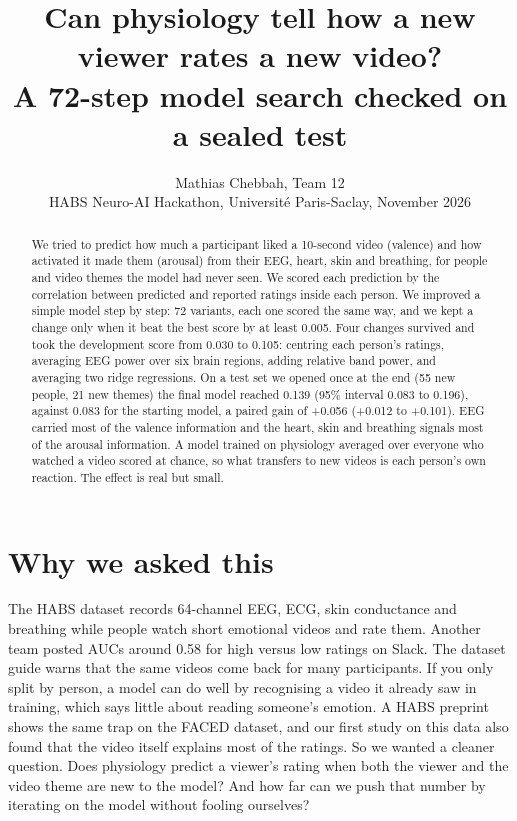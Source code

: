 \documentclass[10pt]{article}
\title{Can physiology tell how a new viewer rates a new video?\\
A 72-step model search checked on a sealed test}
\author{Mathias Chebbah, Team 12\\\small HABS Neuro-AI Hackathon, Universit\'e Paris-Saclay, November 2026}
\date{}
\begin{document}
\maketitle

\begin{abstract}
We tried to predict how much a participant liked a 10-second video (valence)
and how activated it made them (arousal) from their EEG, heart, skin and
breathing, for people and video themes the model had never seen. We scored
each prediction by the correlation between predicted and reported ratings
inside each person. We improved a simple model step by step: 72 variants, each
one scored the same way, and we kept a change only when it beat the best score
by at least 0.005. Four changes survived and took the development score from
0.030 to 0.105: centring each person's ratings, averaging EEG power over six
brain regions, adding relative band power, and averaging two ridge
regressions. On a test set we opened once at the end (55 new people, 21 new
themes) the final model reached 0.139 (95\% interval 0.083 to 0.196), against
0.083 for the starting model, a paired gain of +0.056 (+0.012 to +0.101). EEG
carried most of the valence information and the heart, skin and breathing
signals most of the arousal information. A model trained on physiology
averaged over everyone who watched a video scored at chance, so what
transfers to new videos is each person's own reaction. The effect is real but
small.
\end{abstract}

\section{Why we asked this}

The HABS dataset records 64-channel EEG, ECG, skin conductance and breathing
while people watch short emotional videos and rate them. Another team posted
AUCs around 0.58 for high versus low ratings on Slack. The dataset guide warns
that the same videos come back for many participants. If you only split by
person, a model can do well by recognising a video it already saw in
training, which says little about reading someone's emotion. A HABS preprint shows the same trap on the FACED dataset, and our first study
on this data also found that the video itself explains most of the ratings.
So we wanted a cleaner question. Does physiology predict a viewer's rating
when both the viewer and the video theme are new to the model? And how far can
we push that number by iterating on the model without fooling ourselves?
\end{document}
